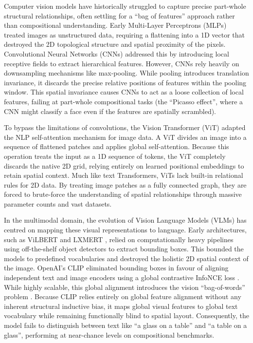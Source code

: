 \documentclass[12pt, a4paper, oneside]{report}
\begin{document}
Computer vision models have historically struggled to capture precise part-whole structural relationships, often settling for a ``bag of features'' approach rather than compositional understanding. Early Multi-Layer Perceptrons (MLPs) \cite{mlp} treated images as unstructured data, requiring a flattening into a 1D vector that destroyed the 2D topological structure and spatial proximity of the pixels. Convolutional Neural Networks (CNNs) \cite{cnn} addressed this by introducing local receptive fields to extract hierarchical features. However, CNNs rely heavily on downsampling mechanisms like max-pooling. While pooling introduces translation invariance, it discards the precise relative positions of features within the pooling window. This spatial invariance causes CNNs to act as a loose collection of local features, failing at part-whole compositional tasks (the ``Picasso effect'', where a CNN might classify a face even if the features are spatially scrambled).

To bypass the limitations of convolutions, the Vision Transformer (ViT) \cite{vit} adapted the NLP self-attention mechanism for image data. A ViT divides an image into a sequence of flattened patches and applies global self-attention. Because this operation treats the input as a 1D sequence of tokens, the ViT completely discards the native 2D grid, relying entirely on learned positional embeddings to retain spatial context. Much like text Transformers, ViTs lack built-in relational rules for 2D data. By treating image patches as a fully connected graph, they are forced to brute-force the understanding of spatial relationships through massive parameter counts and vast datasets.

In the multimodal domain, the evolution of Vision Language Models (VLMs) has centred on mapping these visual representations to language. Early architectures, such as ViLBERT \cite{vilbert} and LXMERT \cite{lxmert}, relied on computationally heavy pipelines using off-the-shelf object detectors to extract bounding boxes. This bounded the models to predefined vocabularies and destroyed the holistic 2D spatial context of the image. OpenAI's CLIP \cite{clip} eliminated bounding boxes in favour of aligning independent text and image encoders using a global contrastive InfoNCE loss \cite{infonce}. While highly scalable, this global alignment introduces the vision ``bag-of-words'' problem \cite{aro}. Because CLIP relies entirely on global feature alignment without any inherent structural inductive bias, it maps global visual features to global text vocabulary while remaining functionally blind to spatial layout. Consequently, the model fails to distinguish between text like ``a glass on a table'' and ``a table on a glass'', performing at near-chance levels on compositional benchmarks.
\end{document}
